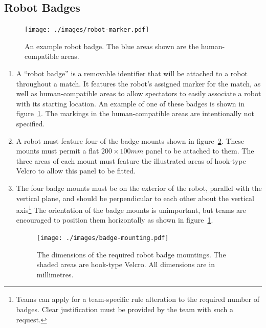 \subsection{Robot Badges}
\label{sec:robot-badges}

\begin{figure}
  \centering
  \texttt{[image: ./images/robot-marker.pdf]}
  \caption{An example robot badge.
 The blue areas shown are the human-compatible areas.}
  \label{fig:example-badge}
\end{figure}

\begin{enumerate}
\item A ``robot badge'' is a removable identifier that will be attached to a robot throughout a match.
      It features the robot's assigned marker for the match, as well as human-compatible areas to allow spectators to easily associate a robot with its starting location.
      An example of one of these badges is shown in figure~\ref{fig:example-badge}.
      The markings in the human-compatible areas are intentionally not specified.

\item A robot must feature four of the badge mounts shown in figure~\ref{fig:badge-mounting}.
      These mounts must permit a flat $200 \times 100mm$ panel to be attached to them.
      The three areas of each mount must feature the illustrated areas of hook-type Velcro to allow this panel to be fitted.

\item The four badge mounts must be on the exterior of the robot, parallel with the vertical plane, and should be perpendicular to each other about the vertical axis\footnote{Teams can apply for a team-specific rule alteration to the required number of badges.
      Clear justification must be provided by the team with such a request.}
      The orientation of the badge mounts is unimportant, but teams are encouraged to position them horizontally as shown in figure~\ref{fig:example-badge}.

\begin{figure}
  \centering
  \texttt{[image: ./images/badge-mounting.pdf]}
  \caption{The dimensions of the required robot badge mountings.
           The shaded areas are hook-type Velcro.
           All dimensions are in millimetres.}
  \label{fig:badge-mounting}
\end{figure}

\end{enumerate}

